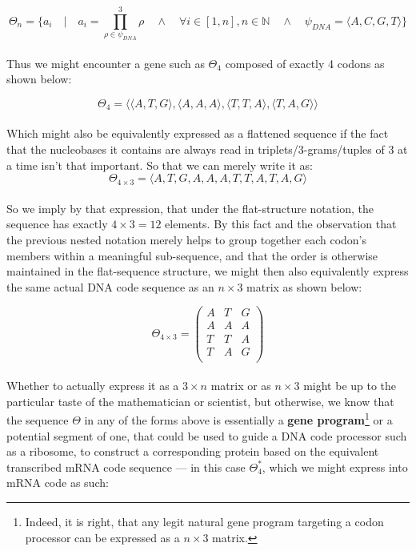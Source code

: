 \documentclass[a4paper, 18pt]{book} %
\begin{document}
 \begin{equation}
\label{EQ3}
\Theta_n = \{a_i \quad | \quad a_i = \prod\limits_{\rho \in \psi_{DNA}}^3 \rho \quad \land \quad \forall i \in [1,n], n \in \mathbb{N} \quad \land \quad \psi_{DNA} = \langle A, C, G, T \rangle\}
\end{equation}\\

Thus we might encounter a gene such as $\Theta_4$ composed of exactly 4 codons as shown below:

 \begin{equation}
\label{EQ4}
\Theta_4 = \langle \langle A, T, G \rangle, \langle A, A, A \rangle, \langle T, T, A \rangle, \langle T, A, G \rangle \rangle
\end{equation}\\

Which might also be equivalently expressed as a flattened sequence if the fact that the nucleobases it contains are always read in triplets/3-grams/tuples of 3 at a time isn't that important. So that we can merely write it as:\\

 \begin{equation}
\label{EQ5}
\Theta_{4 \times 3} = \langle  A, T, G, A, A, A, T, T, A, T, A, G \rangle
\end{equation}\\

So we imply by that expression, that under the flat-structure notation, the sequence has exactly $4 \times 3 = 12$ elements. By this fact and the observation that the previous nested notation merely helps to group together each codon's members within a meaningful sub-sequence, and that the order is otherwise maintained in the flat-sequence structure, we might then also equivalently express the same actual DNA code sequence as an $n \times 3$ matrix as shown below:

 \begin{equation}
\label{EQ5a}
\Theta_{4 \times 3} = \begin{pmatrix}
A& T& G\\
A& A& A\\
T& T& A\\
T& A & G \\
\end{pmatrix}
\end{equation}\\


Whether to actually express it as a $3 \times n$ matrix or as $n \times 3$ might be up to the particular taste of the mathematician or scientist, but otherwise, we know that the sequence $\Theta$ in any of the forms above is essentially a \textbf{gene program}\footnote{Indeed, it is right, that any legit natural gene program targeting a codon processor can be expressed as a $n \times 3$ matrix.} or a potential segment of one, that could be used to guide a DNA code processor such as a ribosome, to construct a corresponding protein based on the equivalent transcribed mRNA code sequence --- in this case $\Theta_4^*$, which we might express into mRNA code as such:
\end{document}
